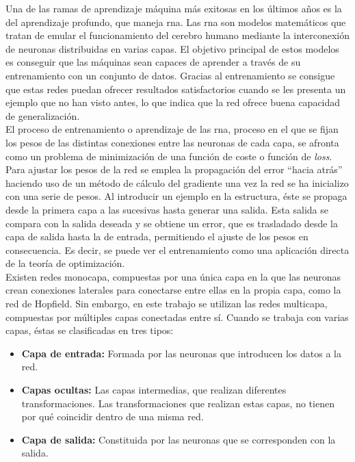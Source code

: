 Una de las ramas de aprendizaje máquina más exitosas en los últimos años es la del aprendizaje profundo, que maneja \acrfull{rna}. Las \acrshort{rna}\cite{rna} son modelos matemáticos que tratan de emular el funcionamiento del cerebro humano mediante la interconexión de neuronas distribuidas en varias capas. El objetivo principal de estos modelos es conseguir que las máquinas sean capaces de aprender a través de su entrenamiento con un conjunto de datos. Gracias al entrenamiento se consigue que estas redes puedan ofrecer resultados satisfactorios cuando se les presenta un ejemplo que no han visto antes, lo que indica que la red ofrece buena capacidad de generalización.\\

El proceso de entrenamiento o aprendizaje de las \acrshort{rna}, proceso en el que se fijan los pesos de las distintas conexiones entre las neuronas de cada capa, se afronta como un problema de minimización de una función de coste o función de \textit{loss}. Para ajustar los  pesos de la red se emplea la propagación del error ``hacia atrás'' haciendo uso de un método de cálculo del gradiente una vez la red se ha inicializo con una serie de pesos. Al introducir un ejemplo en la estructura, éste se propaga desde la primera capa a las sucesivas hasta generar una salida. Esta salida se compara con la salida deseada y se obtiene un error, que es trasladado desde la capa de salida hasta la de entrada, permitiendo el ajuste de los pesos en consecuencia. Es decir, se puede ver el entrenamiento como una aplicación directa de la teoría de optimización.\\

Existen redes monocapa, compuestas por una única capa en la que las neuronas crean conexiones laterales para conectarse entre ellas en la propia capa, como la red de Hopfield. Sin embargo, en este trabajo se utilizan las redes multicapa, compuestas por múltiples capas conectadas entre sí. Cuando se trabaja con varias capas, éstas se clasificadas en tres tipos:
\begin{itemize}
    \item \textbf{Capa de entrada:} Formada por las neuronas que introducen los datos a la red.
    \item \textbf{Capas ocultas:} Las capas intermedias, que realizan diferentes transformaciones. Las transformaciones que realizan estas capas, no tienen por qué coincidir dentro de una misma red.
    \item \textbf{Capa de salida:} Constituida por las neuronas que se corresponden con la salida. 
\end{itemize}


